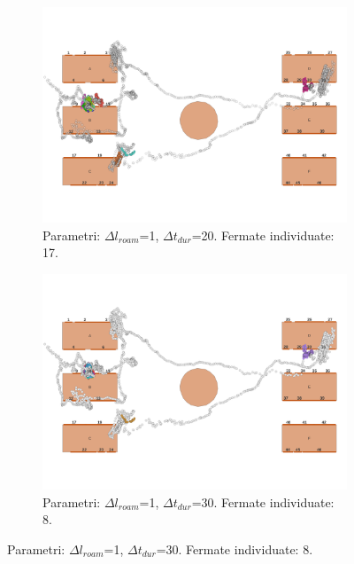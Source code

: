 \documentclass[12pt]{article}
\begin{document}
\begin{figure}[htb!]
\begin{subfigure}[b]{0.45\textwidth}
        \label{stop_points_p57_PMLH_r1_s30}
    \end{subfigure}
    \hfill
    \begin{subfigure}[b]{0.45\textwidth}
        \centering
        \includegraphics[width=\textwidth]{images/stop_points_p67_PMLH_r1_s20.png}
        \caption{Parametri: $\Delta l_{roam}$=1, $\Delta t_{dur}$=20. Fermate individuate: 17.}
        \label{stop_points_p67_PMLH_r1_s20}
    \end{subfigure}
    \hfill
    \begin{subfigure}[b]{0.45\textwidth}
        \centering
        \includegraphics[width=\textwidth]{images/stop_points_p67_PMLH_r1_s30.png}
        \caption{Parametri: $\Delta l_{roam}$=1, $\Delta t_{dur}$=30. Fermate individuate: 8.}
        \label{stop_points_p67_PMLH_r1_s30}
    \end{subfigure}

\end{figure}
\end{document}
